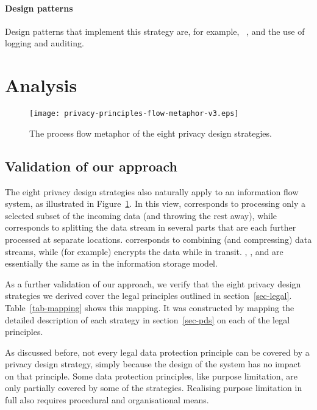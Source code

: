 \paragraph{Design patterns}

Design patterns that implement this strategy are, for example, ~\cite{DBLP:conf/trustbus/MontP05}, and the use of logging and auditing.

\section{Analysis}
\label{sec-validate}


\begin{figure}[t]
\begin{center}
\texttt{[image: privacy-principles-flow-metaphor-v3.eps]}
\end{center}
\caption{The process flow metaphor of the eight privacy design strategies.} 
\label{fig-flow-metaphor}
\end{figure}

\subsection{Validation of our approach}

The eight privacy design strategies also naturally apply to an information flow system, as illustrated in Figure~\ref{fig-flow-metaphor}. In this view,  corresponds to processing only a selected subset of the incoming data (and throwing the rest away), while  corresponds to splitting the data stream in 
several parts that are each further processed at separate locations. 
 corresponds to combining (and compressing) data streams, while  (for example) encrypts the data while in transit. , ,  and  are essentially the same as in the information storage model.



As a further validation of our approach, we verify that the eight privacy design strategies we derived cover the legal principles outlined in section~\ref{sec-legal}. Table~\ref{tab-mapping} shows this mapping. It was constructed by mapping the detailed description of each strategy in section~\ref{sec-pds} on each of the legal principles.

As discussed before, not every legal data protection principle can be covered by a privacy design strategy, simply because the design of the system has no impact on that principle. Some data protection principles, like purpose limitation, are only partially covered by some of the strategies. Realising purpose limitation in full also requires procedural and organisational means.

